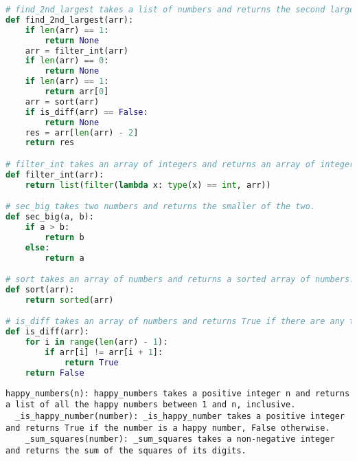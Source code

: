 \begin{figure*}
\begin{lstlisting}[language=Python]
# find_2nd_largest takes a list of numbers and returns the second largest number in the list.
def find_2nd_largest(arr):
    if len(arr) == 1:
        return None
    arr = filter_int(arr)
    if len(arr) == 0:
        return None
    if len(arr) == 1:
        return arr[0]
    arr = sort(arr)
    if is_diff(arr) == False:
        return None
    res = arr[len(arr) - 2]
    return res

# filter_int takes an array of integers and returns an array of integers.
def filter_int(arr):
    return list(filter(lambda x: type(x) == int, arr))

# sec_big takes two numbers and returns the smaller of the two.
def sec_big(a, b):
    if a > b:
        return b
    else:
        return a

# sort takes an array of numbers and returns a sorted array of numbers.
def sort(arr):
    return sorted(arr)

# is_diff takes an array of numbers and returns True if there are any two numbers in the array that are different, and False if all the numbers in the array are the same.
def is_diff(arr):
    for i in range(len(arr) - 1):
        if arr[i] != arr[i + 1]:
            return True
    return False
\end{lstlisting}
\caption{Train Problem 3090, Solution 9}
\end{figure*}

\begin{figure*}
\begin{lstlisting}
happy_numbers(n): happy_numbers takes a positive integer n and returns a list of all the happy numbers between 1 and n, inclusive.
  _is_happy_number(number): _is_happy_number takes a positive integer and returns True if the number is a happy number, False otherwise.
    _sum_squares(number): _sum_squares takes a non-negative integer and returns the sum of the squares of its digits.
\end{lstlisting}
\caption{Train Problem 3140, Solution 7}
\end{figure*}

